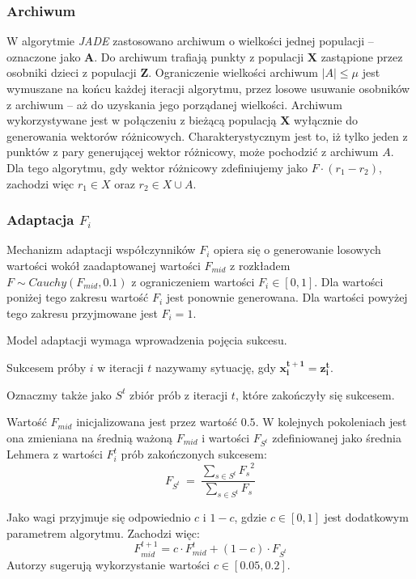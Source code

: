\documentclass[12pt,a4paper]{report}
\begin{document}
{{{\begin{description}
\subsubsection{Archiwum}
\par{
W algorytmie \emph{JADE} zastosowano archiwum o wielkości jednej populacji -- oznaczone jako $\mathbf{A}$. Do archiwum trafiają punkty z populacji $\mathbf{X}$ zastąpione przez osobniki dzieci z populacji $\mathbf{Z}$. Ograniczenie wielkości archiwum $|A| \le \mu$ jest wymuszane na końcu każdej iteracji algorytmu, przez losowe usuwanie osobników z archiwum -- aż do uzyskania jego porządanej wielkości. Archiwum wykorzystywane jest w połączeniu z bieżącą populacją $\mathbf{X}$ wyłącznie do generowania wektorów różnicowych. Charakterystycznym jest to, iż tylko jeden z punktów z pary generującej wektor różnicowy, może pochodzić z archiwum $A$. Dla tego algorytmu, gdy wektor różnicowy zdefiniujemy jako $F \cdot (r_1 - r_2)$, zachodzi więc $r_1 \in X$ oraz $r_2 \in X \cup A$.
}
\subsubsection{Adaptacja $F_i$}
\par{
Mechanizm adaptacji współczynników $F_i$ opiera się o generowanie losowych wartości wokół zaadaptowanej wartości $F_{mid}$ z rozkładem $F \sim Cauchy(F_{mid}, 0.1)$ z ograniczeniem wartości $F_i \in [0, 1]$. Dla wartości poniżej tego zakresu wartość $F_i$ jest ponownie generowana. Dla wartości powyżej tego zakresu przyjmowane jest $F_i = 1$.
}
\par{
Model adaptacji wymaga wprowadzenia pojęcia sukcesu.
\par{
\begin{OptDefinition}
Sukcesem próby $i$ w iteracji $t$ nazywamy sytuację, gdy $\mathbf{x_i^{t+1} = z_i^t}$.
\end{OptDefinition}
}
Oznaczmy także jako $S^t$ zbiór prób z iteracji $t$, które zakończyły się sukcesem.
}
\par{
Wartość $F_{mid}$ inicjalizowana jest przez wartość $0.5$. W kolejnych pokoleniach jest ona zmieniana na średnią ważoną $F_{mid}$ i wartości $F_{S^t}$ zdefiniowanej jako średnia Lehmera z wartości $F_{i}^{t}$ prób zakończonych sukcesem:
}
\begin{equation}
F_{S^t}~=~\frac{\sum_{s \in S^t} {F_s}^2}{\sum_{s \in S^t} {F_s}}
\end{equation}

\par{
Jako wagi przyjmuje się odpowiednio $c$ i $1 - c$, gdzie $c \in [0,1]$ jest dodatkowym parametrem algorytmu. Zachodzi więc:
\begin{equation}
\label{eq:AdaptationJADEFormula}
F_{mid}^{t+1} = c \cdot F_{mid}^t + (1 - c) \cdot F_{S^t}
\end{equation}
Autorzy \cite{JADE} sugerują wykorzystanie wartości $c \in [0.05, 0.2]$.
}


\end{description}}}}
\end{document}
